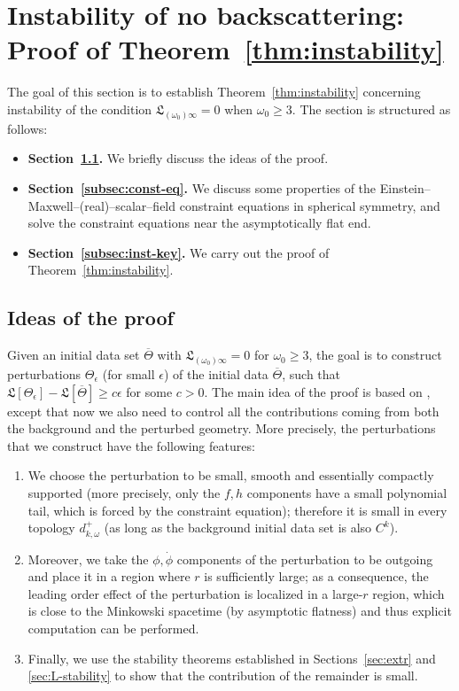\documentclass[10pt, reqno]{amsart}
\theoremstyle{definition}
\theoremstyle{remark}
\theoremstyle{conjecture}
\numberwithin{equation}{section}
\newcommand{\ep}{\epsilon}
\newcommand{\0}{\emptyset}
\newcommand{\eps}{\epsilon}
\newcommand{\Tht}{\Theta}
\newcommand{\omg}{\omega}
\begin{document}
\section{Instability of no backscattering: Proof of Theorem~\ref{thm:instability}} \label{sec:instability}
The goal of this section is to establish Theorem~\ref{thm:instability} concerning instability of the condition $\mathfrak{L}_{(\omg_{0}) \infty} = 0$ when $\omg_0\geq 3$. The section is structured as follows:
\begin{itemize}
\item \textbf{Section~\ref{sec:instability.ideas}.} We briefly discuss the ideas of the proof.
\item \textbf{Section~\ref{subsec:const-eq}.} We discuss some properties of the Einstein--Maxwell--(real)--scalar--field constraint equations in spherical symmetry, and solve the constraint equations near the asymptotically flat end. 
\item \textbf{Section~\ref{subsec:inst-key}.} We carry out the proof of Theorem~\ref{thm:instability}.
\end{itemize}

\subsection{Ideas of the proof}\label{sec:instability.ideas}
Given an initial data set $\overline{\Tht}$ with $\mathfrak{L}_{(\omg_{0}) \infty} = 0$ for $\omg_0\geq 3$, the goal is to construct perturbations $\Tht_{\eps}$ (for small $\eps$) of the initial data $\overline{\Tht}$, such that $\mathfrak{L}[\Tht_\ep] -\mathfrak{L}[\overline{\Tht}] \geq c \eps$ for some $c > 0$. The main idea of the proof is based on \cite[Theorem~1.5]{LO.instab}, except that now we also need to control all the contributions coming from both the background and the perturbed geometry. More precisely, the perturbations that we construct have the following features:
\begin{enumerate}
\item We choose the perturbation to be small, smooth and essentially compactly supported (more precisely, only the $f, h$ components have a small polynomial tail, which is forced by the constraint equation); therefore it is small in every topology $d_{k, \omg}^{+}$ (as long as the background initial data set is also $C^k$). 
\item Moreover, we take the $\phi, \dot{\phi}$ components of the perturbation to be outgoing and place it in a region where $r$ is sufficiently large; as a consequence, the leading order effect of the perturbation is localized in a large-$r$ region, which is close to the Minkowski spacetime (by asymptotic flatness) and thus explicit computation can be performed. 
\item Finally, we use the stability theorems established in Sections~\ref{sec:extr} and \ref{sec:L-stability} to show that the contribution of the remainder is small. 
\end{enumerate}
\end{document}

